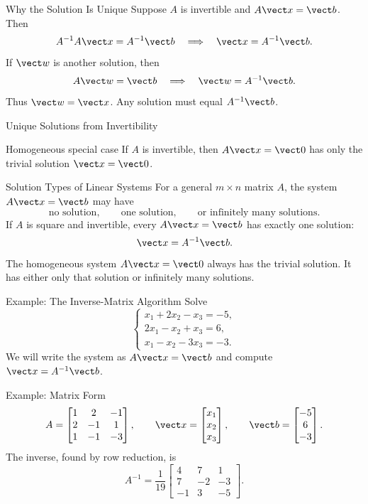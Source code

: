 \begin{frame}{Why the Solution Is Unique}
Suppose $A$ is invertible and $A\vect x=\vect b$. Then
\[
A^{-1}A\vect x=A^{-1}\vect b
\quad\Longrightarrow\quad
\vect x=A^{-1}\vect b.
\]
\pause
If $\vect w$ is another solution, then
\[
A\vect w=\vect b
\quad\Longrightarrow\quad
\vect w=A^{-1}\vect b.
\]
Thus $\vect w=\vect x$. Any solution must equal $A^{-1}\vect b$.
\end{frame}

\begin{frame}{Unique Solutions from Invertibility}
\medskip
\begin{block}{Homogeneous special case}
If $A$ is invertible, then $A\vect x=\vect0$ has only the trivial solution $\vect x=\vect0$.
\end{block}
\end{frame}

\begin{frame}{Solution Types of Linear Systems}
For a general $m\times n$ matrix $A$, the system $A\vect x=\vect b$ may have
\[
\text{no solution},\qquad \text{one solution},\qquad\text{or infinitely many solutions}.
\]
\pause
If $A$ is square and invertible, every $A\vect x=\vect b$ has exactly one solution:
\[
\vect x=A^{-1}\vect b.
\]
\pause
The homogeneous system $A\vect x=\vect0$ always has the trivial solution. It has either only that solution or infinitely many solutions.
\end{frame}

\begin{frame}{Example: The Inverse-Matrix Algorithm}
Solve
\[
\begin{cases}
x_1+2x_2-x_3=-5,\\
2x_1-x_2+x_3=6,\\
x_1-x_2-3x_3=-3.
\end{cases}
\]
\pause
We will write the system as $A\vect x=\vect b$ and compute $\vect x=A^{-1}\vect b$.
\end{frame}

\begin{frame}{Example: Matrix Form}
\[
A=\begin{bmatrix}
1&2&-1\\2&-1&1\\1&-1&-3
\end{bmatrix},\qquad
\vect x=\begin{bmatrix}x_1\\x_2\\x_3\end{bmatrix},\qquad
\vect b=\begin{bmatrix}-5\\6\\-3\end{bmatrix}.
\]
The inverse, found by row reduction, is
\[
A^{-1}=\frac1{19}
\begin{bmatrix}
4&7&1\\7&-2&-3\\-1&3&-5
\end{bmatrix}.
\]
\end{frame}

